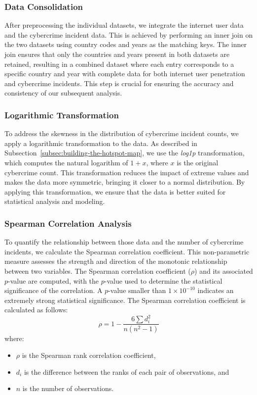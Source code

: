     \subsubsection{Data Consolidation} %
        After preprocessing the individual datasets, we integrate the internet user data and the cybercrime incident data.
        This is achieved by performing an inner join on the two datasets using country codes and years as the matching keys.
        The inner join ensures that only the countries and years present in both datasets are retained,
        resulting in a combined dataset where each entry corresponds to a specific country and year with complete data
        for both internet user penetration and cybercrime incidents.
        This step is crucial for ensuring the accuracy and consistency of our subsequent analysis.

    \subsubsection{Logarithmic Transformation} %
        To address the skewness in the distribution of cybercrime incident counts,
        we apply a logarithmic transformation to the data.
        As described in Subsection~\ref{subsec:building-the-hotspot-map},
        we use the \textit{log1p} transformation, which computes the natural logarithm of \(1 + x\),
        where \(x\) is the original cybercrime count.
        This transformation reduces the impact of extreme values and makes the data more symmetric,
        bringing it closer to a normal distribution.
        By applying this transformation, we ensure that the data is better suited for statistical analysis and modeling.

    \subsubsection{Spearman Correlation Analysis} %
        To quantify the relationship between those data and the number of cybercrime incidents,
        we calculate the Spearman correlation coefficient.
        This non-parametric measure assesses the strength and direction of the monotonic relationship between two variables.
        The Spearman correlation coefficient (\(\rho\)) and its associated \(p\)-value are computed,
        with the \(p\)-value used to determine the statistical significance of the correlation.
        A \(p\)-value smaller than \(1 \times 10^{-10}\) indicates an extremely strong statistical significance.
        The Spearman correlation coefficient is calculated as follows:
        \[ \rho = 1 - \frac{6 \sum d_i^2}{n(n^2 - 1)} \]
        where:
        \begin{itemize}
            \item \(\rho\) is the Spearman rank correlation coefficient,
            \item \(d_i\) is the difference between the ranks of each pair of observations, and
            \item \(n\) is the number of observations.
        \end{itemize}

